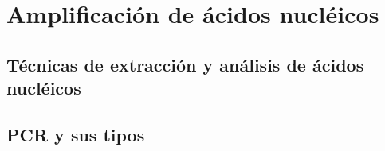 \documentclass{../summarie}
\begin{document}
\part{Amplificación de ácidos nucléicos}

    \chapter{Técnicas de extracción y análisis de ácidos nucléicos} 
    \chapter{PCR y sus tipos} 


\backmatter



\appendix
\end{document}

